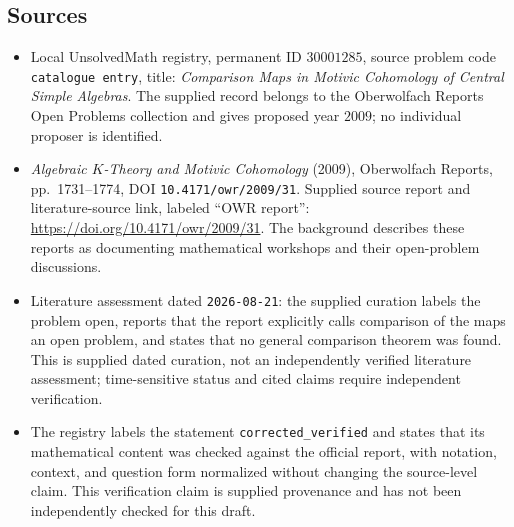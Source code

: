 \documentclass[11pt]{article}
\begin{document}
\subsection{Sources}
\begin{itemize}
\item Local UnsolvedMath registry, permanent ID \(30001285\), source problem code \texttt{catalogue entry}, title: \emph{Comparison Maps in Motivic Cohomology of Central Simple Algebras}. The supplied record belongs to the Oberwolfach Reports Open Problems collection and gives proposed year \(2009\); no individual proposer is identified.
\item \emph{Algebraic \(K\)-Theory and Motivic Cohomology} (2009), Oberwolfach Reports, pp.~1731--1774, DOI \texttt{10.4171/owr/2009/31}. Supplied source report and literature-source link, labeled ``OWR report'': \url{https://doi.org/10.4171/owr/2009/31}. The background describes these reports as documenting mathematical workshops and their open-problem discussions.
\item Literature assessment dated \texttt{2026-08-21}: the supplied curation labels the problem open, reports that the report explicitly calls comparison of the maps an open problem, and states that no general comparison theorem was found. This is supplied dated curation, not an independently verified literature assessment; time-sensitive status and cited claims require independent verification.
\item The registry labels the statement \texttt{corrected\_verified} and states that its mathematical content was checked against the official report, with notation, context, and question form normalized without changing the source-level claim. This verification claim is supplied provenance and has not been independently checked for this draft.
\end{itemize}
\end{document}
